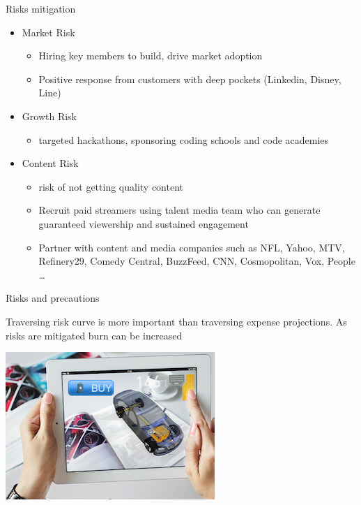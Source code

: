 \documentclass[12pt]{beamer}
\begin{document}
\begin{frame}[fragile]{Risks mitigation}
 \begin{itemize}[<+-| alert@+>]
\item[ ]Market Risk
\begin{itemize}[<+-| alert@+>]
\item Hiring key members to build, drive market adoption
\item Positive response from customers with deep pockets (Linkedin, Disney, Line) 
\end{itemize}

\item[ ]Growth Risk
\begin{itemize}[<+-| alert@+>]
\item targeted hackathons, sponsoring coding schools and code academies
\end{itemize}

\item[ ]Content Risk
\begin{itemize}[<+-| alert@+>]
\item risk of not getting quality content
\item Recruit paid streamers using talent media team who can generate guaranteed viewership and sustained engagement
\item Partner with content and media companies such as NFL, Yahoo, MTV, Refinery29, Comedy Central, BuzzFeed, CNN, Cosmopolitan, Vox, People \ldots
\end{itemize}

\end{itemize}
\end{frame}
\begin{frame}[standout]
 Risks and precautions



 Traversing risk curve is more important than traversing expense projections. As risks are mitigated burn can be increased 

\includegraphics[scale=.2]{static/arad/arad5}
 
\end{frame}
\end{document}
